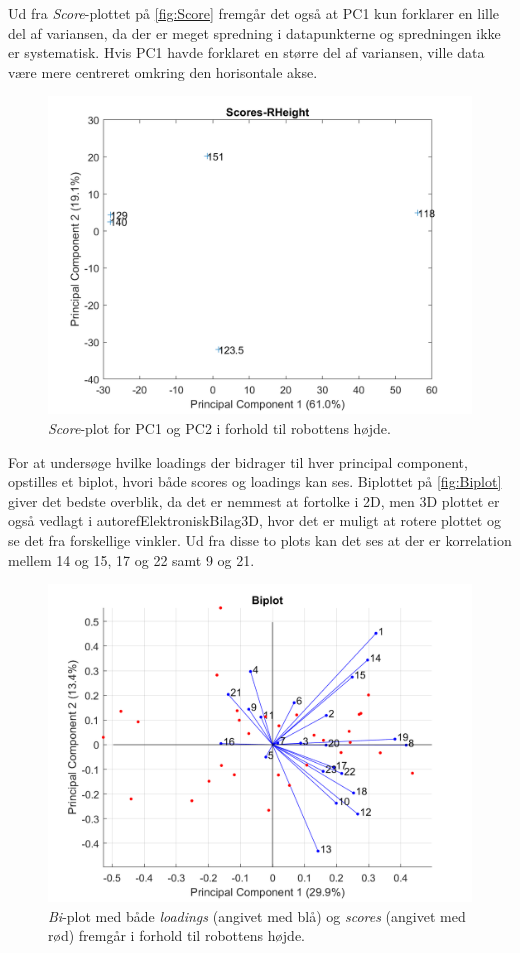 Ud fra \textit{Score}-plottet på \autoref{fig:Score} fremgår det også at PC1 kun forklarer en lille del af variansen, da der er meget spredning i datapunkterne og spredningen ikke er systematisk. Hvis PC1 havde forklaret en større del af variansen, ville data være mere centreret omkring den horisontale akse.
%
\begin{figure}[H]
\centering
\includegraphics[width=\textwidth]{Figure/DatabehandlingSkalaer/PCAfigures/RHeight-Scores}
\caption{\textit{Score}-plot for PC1 og PC2 i forhold til robottens højde.}
\label{fig:Score}
\end{figure}
\noindent
%
For at undersøge hvilke loadings der bidrager til hver principal component, opstilles et biplot, hvori både scores og loadings kan ses. Biplottet på \autoref{fig:Biplot} giver det bedste overblik, da det er nemmest at fortolke i 2D, men 3D plottet er også vedlagt i autoref{ElektroniskBilag3D}, hvor det er muligt at rotere plottet og se det fra forskellige vinkler. Ud fra disse to plots kan det ses at der er korrelation mellem 14 og 15, 17 og 22 samt 9 og 21.
%
\begin{figure}[H]
\centering
\includegraphics[width=\textwidth]{Figure/DatabehandlingSkalaer/PCAfigures/Biplot}
\caption{\textit{Bi}-plot med både \textit{loadings} (angivet med blå) og \textit{scores} (angivet med rød) fremgår i forhold til robottens højde.}
\label{fig:Biplot}
\end{figure}
\noindent
%


